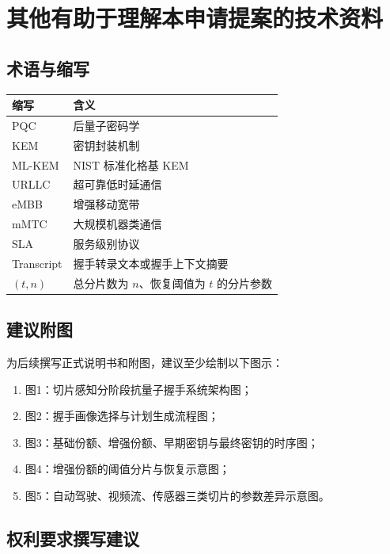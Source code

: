 \documentclass[12pt,a4paper]{article}
\begin{document}
\section{其他有助于理解本申请提案的技术资料}

\subsection{术语与缩写}

\begin{center}
\renewcommand{\arraystretch}{1.3}
\begin{tabular}{|p{3cm}|p{11cm}|}
\hline
缩写 & 含义 \\ \hline
PQC & 后量子密码学 \\ \hline
KEM & 密钥封装机制 \\ \hline
ML-KEM & NIST 标准化格基 KEM \\ \hline
URLLC & 超可靠低时延通信 \\ \hline
eMBB & 增强移动宽带 \\ \hline
mMTC & 大规模机器类通信 \\ \hline
SLA & 服务级别协议 \\ \hline
Transcript & 握手转录文本或握手上下文摘要 \\ \hline
$(t,n)$ & 总分片数为 $n$、恢复阈值为 $t$ 的分片参数 \\ \hline
\end{tabular}
\end{center}

\subsection{建议附图}

为后续撰写正式说明书和附图，建议至少绘制以下图示：

\begin{enumerate}[leftmargin=2em]
    \item 图1：切片感知分阶段抗量子握手系统架构图；
    \item 图2：握手画像选择与计划生成流程图；
    \item 图3：基础份额、增强份额、早期密钥与最终密钥的时序图；
    \item 图4：增强份额的阈值分片与恢复示意图；
    \item 图5：自动驾驶、视频流、传感器三类切片的参数差异示意图。
\end{enumerate}

\subsection{权利要求撰写建议}
\end{document}
